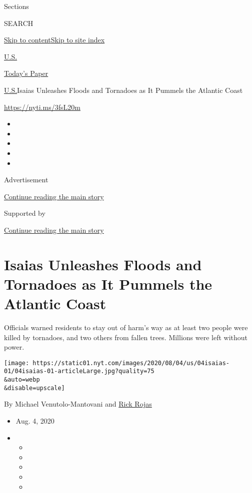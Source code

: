Sections

SEARCH

\protect\hyperlink{site-content}{Skip to
content}\protect\hyperlink{site-index}{Skip to site index}

\href{https://www.nytimes.com/section/us}{U.S.}

\href{https://myaccount.nytimes.com/auth/login?response_type=cookie\&client_id=vi}{}

\href{https://www.nytimes.com/section/todayspaper}{Today's Paper}

\href{/section/us}{U.S.}\textbar{}Isaias Unleashes Floods and Tornadoes
as It Pummels the Atlantic Coast

\url{https://nyti.ms/3fsL20m}

\begin{itemize}
\item
\item
\item
\item
\item
\end{itemize}

Advertisement

\protect\hyperlink{after-top}{Continue reading the main story}

Supported by

\protect\hyperlink{after-sponsor}{Continue reading the main story}

\hypertarget{isaias-unleashes-floods-and-tornadoes-as-it-pummels-the-atlantic-coast}{%
\section{Isaias Unleashes Floods and Tornadoes as It Pummels the
Atlantic
Coast}\label{isaias-unleashes-floods-and-tornadoes-as-it-pummels-the-atlantic-coast}}

Officials warned residents to stay out of harm's way as at least two
people were killed by tornadoes, and two others from fallen trees.
Millions were left without power.

\texttt{[image: https://static01.nyt.com/images/2020/08/04/us/04isaias-01/04isaias-01-articleLarge.jpg?quality=75\\\&auto=webp\\\&disable=upscale]}

By Michael Venutolo-Mantovani and
\href{https://www.nytimes.com/by/rick-rojas}{Rick Rojas}

\begin{itemize}
\item
  Aug. 4, 2020
\item
  \begin{itemize}
  \item
  \item
  \item
  \item
  \item
  \end{itemize}
\end{itemize}

